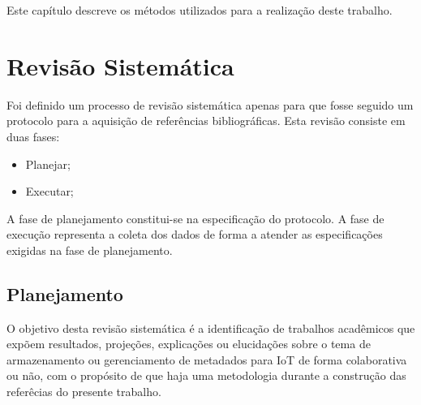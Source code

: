 \newcommand{\texCommand}[1]{\texttt{\textbackslash{#1}}}%

\newcommand{\exemplo}[1]{%
\vspace{\baselineskip}%
\noindent\fbox{\begin{minipage}{\textwidth}#1\end{minipage}}%
\\\vspace{\baselineskip}}%

\newcommand{\exemploVerbatim}[1]{%
\vspace{\baselineskip}%
\noindent\fbox{\begin{minipage}{\textwidth}%
#1\end{minipage}}%
\\\vspace{\baselineskip}}%


\quad Este capítulo descreve os métodos utilizados para a realização deste trabalho.

\section{Revisão Sistemática}
\quad Foi definido um processo de revisão sistemática apenas para que fosse seguido um protocolo para a aquisição de referências bibliográficas. Esta revisão consiste em duas fases:
\begin{itemize}
  \item Planejar;
  \item Executar;
\end{itemize}
\quad A fase de planejamento constitui-se na especificação do protocolo.
A fase de execução representa a coleta dos dados de forma a atender as especificações
exigidas na fase de planejamento.

\subsection{Planejamento}
\quad O objetivo desta revisão sistemática é a identificação de trabalhos acadêmicos
que expõem resultados, projeções, explicações ou elucidações sobre o tema de armazenamento ou gerenciamento
de metadados para \acrlong{IoT} de forma colaborativa ou não, com o propósito de que haja uma metodologia durante a construção das referêcias do presente trabalho.

